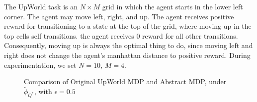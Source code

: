 \documentclass{article}
\newcommand{\ep}{\widetilde \phi}
\newcommand{\epQ}{\ep_{Q^*}}
\begin{document}
The UpWorld task is an $N\times M$ grid in which the agent starts in the lower left corner. The agent may move left, right, and up. The agent receives positive reward for transitioning to a state at the top of the grid, where moving up in the top cells self transitions. the agent receives 0 reward for all other transitions. Consequently, moving up is always the optimal thing to do, since moving left and right does not change the agent's manhattan distance to positive reward. During experimentation, we set $N=10$, $M=4$. 


\begin{figure}
\label{fig:eps-states}
\caption{Comparison of Original UpWorld MDP and Abstract MDP, under $\epQ$, with $\epsilon=0.5$}
\end{figure} 

\end{document}

